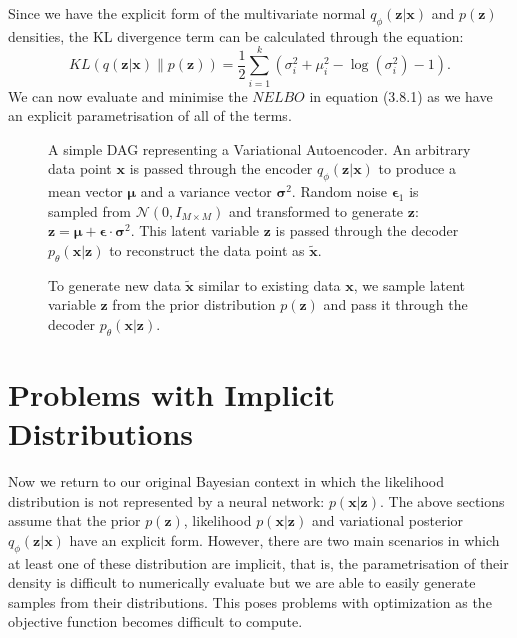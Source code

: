 \documentclass[honours,12pt]{unswthesis}
\numberwithin{equation}{section}
\theoremstyle{definition}
\begin{document}
Since we have the explicit form of the multivariate normal $q_\phi(\bm{z}|\bm{x})$ and $p(\bm{z})$ densities, the KL divergence term can be calculated through the equation:
\[KL(q(\bm{z}|\bm{x})\|p(\bm{z}))=\frac12 \sum_{i=1}^k\left(\sigma^2_i+\mu^2_i-\log(\sigma^2_i)-1\right).\]
We can now evaluate and minimise the $NELBO$ in equation (3.8.1) as we have an explicit parametrisation of all of the terms.
\begin{figure}[h]
  \centering
   \caption{\small A simple DAG representing a Variational Autoencoder. An arbitrary data point $\bm{x}$ is passed through the encoder $q_\phi(\bm{z}|\bm{x})$ to produce a mean vector $\bm{\mu}$ and a variance vector $\bm{\sigma}^2$. Random noise $\bm{\epsilon}_1$ is sampled from $\mathcal{N}(0,I_{M\times M})$ and transformed to generate $\bm{z}$: $\bm{z}=\bm{\mu}+\bm{\epsilon}\cdot \bm{\sigma}^2$. This latent variable $\bm{z}$ is passed through the decoder $p_\theta(\bm{x}|\bm{z})$ to reconstruct the data point as $\tilde{\bm{x}}$.}
\end{figure}
\begin{figure}[h]
  \centering
   \caption{\small To generate new data $\tilde{\bm{x}}$ similar to existing data $\bm{x}$, we sample latent variable $\bm{z}$ from the prior distribution $p(\bm{z})$ and pass it through the decoder $p_\theta(\bm{x}|\bm{z})$.}
\end{figure}
\section{Problems with Implicit Distributions}
Now we return to our original Bayesian context in which the likelihood distribution is not represented by a neural network: $p(\bm{x}|\bm{z})$. The above sections assume that the prior $p(\bm{z})$, likelihood $p(\bm{x}|\bm{z})$ and variational posterior $q_\phi(\bm{z}|\bm{x})$ have an explicit form. However, there are two main scenarios in which at least one of these distribution are implicit, that is, the parametrisation of their density is difficult to numerically evaluate but we are able to easily generate samples from their distributions. This poses problems with optimization as the objective function becomes difficult to compute. 
\end{document}
